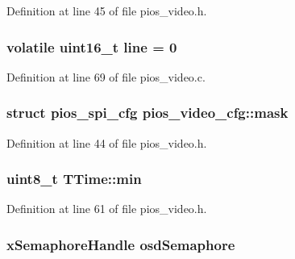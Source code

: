 \-Definition at line 45 of file pios\-\_\-video.\-h.

\hypertarget{group___p_i_o_s___v_i_d_e_o_ga308d53a9c395c298132110da98adb7c7}{
\subsubsection[{line}]{\setlength{\rightskip}{0pt plus 5cm}volatile uint16\-\_\-t {\bf line} = 0}}\label{group___p_i_o_s___v_i_d_e_o_ga308d53a9c395c298132110da98adb7c7}


\-Definition at line 69 of file pios\-\_\-video.\-c.

\hypertarget{group___p_i_o_s___v_i_d_e_o_gac6699e31fbc588e69db444000ba7d44d}{
\subsubsection[{mask}]{\setlength{\rightskip}{0pt plus 5cm}struct {\bf pios\-\_\-spi\-\_\-cfg} {\bf pios\-\_\-video\-\_\-cfg\-::mask}}}\label{group___p_i_o_s___v_i_d_e_o_gac6699e31fbc588e69db444000ba7d44d}


\-Definition at line 44 of file pios\-\_\-video.\-h.

\hypertarget{group___p_i_o_s___v_i_d_e_o_gadb9b0440ee5ef05786949736913ce45c}{
\subsubsection[{min}]{\setlength{\rightskip}{0pt plus 5cm}uint8\-\_\-t {\bf \-T\-Time\-::min}}}\label{group___p_i_o_s___v_i_d_e_o_gadb9b0440ee5ef05786949736913ce45c}


\-Definition at line 61 of file pios\-\_\-video.\-h.

\hypertarget{group___p_i_o_s___v_i_d_e_o_ga34f96a89a1ad6c4649787dbc18e218e5}{
\subsubsection[{osd\-Semaphore}]{\setlength{\rightskip}{0pt plus 5cm}x\-Semaphore\-Handle {\bf osd\-Semaphore}}}\label{group___p_i_o_s___v_i_d_e_o_ga34f96a89a1ad6c4649787dbc18e218e5}


